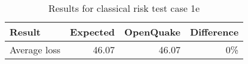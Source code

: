\begin{table}[htbp]

\centering
\begin{tabular}{ l r r r }

\hline
\rowcolor{anti-flashwhite}
\bf{Result} & \bf{Expected} & \bf{OpenQuake} & \bf{Difference}\\
\hline
Average loss & 46.07 & 46.07 & 0\% \\
\hline
\end{tabular}

\caption{Results for classical risk test case 1e}
\label{tab:result-cr-1e}
\end{table}